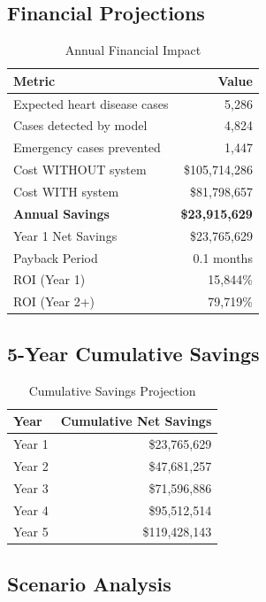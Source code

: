 \documentclass[12pt,a4paper]{article}
\begin{document}
\subsection{Financial Projections}

\begin{table}[H]
\centering
\caption{Annual Financial Impact}
\begin{tabular}{|l|r|}
\hline
\textbf{Metric} & \textbf{Value} \\
\hline
Expected heart disease cases & 5,286 \\
Cases detected by model & 4,824 \\
Emergency cases prevented & 1,447 \\
\hline
Cost WITHOUT system & \$105,714,286 \\
Cost WITH system & \$81,798,657 \\
\hline
\textbf{Annual Savings} & \textbf{\$23,915,629} \\
Year 1 Net Savings & \$23,765,629 \\
Payback Period & 0.1 months \\
ROI (Year 1) & 15,844\% \\
ROI (Year 2+) & 79,719\% \\
\hline
\end{tabular}
\end{table}

\subsection{5-Year Cumulative Savings}

\begin{table}[H]
\centering
\caption{Cumulative Savings Projection}
\begin{tabular}{|l|r|}
\hline
\textbf{Year} & \textbf{Cumulative Net Savings} \\
\hline
Year 1 & \$23,765,629 \\
Year 2 & \$47,681,257 \\
Year 3 & \$71,596,886 \\
Year 4 & \$95,512,514 \\
Year 5 & \$119,428,143 \\
\hline
\end{tabular}
\end{table}

\subsection{Scenario Analysis}
\end{document}
